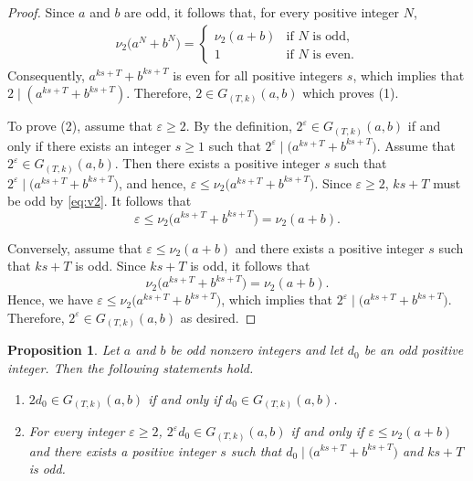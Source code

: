 \documentclass[pdflatex,sn-mathphys-num]{sn-jnl}%
\theoremstyle{thmstyleone}%
\newtheorem{proposition}[theorem]{Proposition}%
\theoremstyle{thmstyletwo}%
\theoremstyle{thmstylethree}%
\begin{document}
\begin{proof}   Since $a$ and $b$ are odd, it follows that, for every positive integer $N$,
\begin{align} \label{eq:v2}
\nu_2\bigl(a^{N}+b^{N}\bigr)=
\begin{cases}
\nu_2(a+b) & \text{if } N \text{ is odd},\\[1mm]
1 & \text{if } N \text{ is even}.
\end{cases}
\end{align}
Consequently, $a^{ks+T}+b^{ks+T}$ is  even for all positive integers $s$, which implies that 
$
2\mid (a^{ks+T}+b^{ks+T})$.   Therefore, 
$
2\in G_{(T,k)}(a,b)$ which proves (1).




 


To prove (2), assume that $\varepsilon\ge 2$. By the definition,
$
2^\varepsilon\in G_{(T,k)}(a,b)
$
if and only if there exists an integer $s\ge 1$ such that
$
2^\varepsilon\mid \bigl(a^{ks+T}+b^{ks+T}\bigr)$. Assume that
$
2^\varepsilon\in G_{(T,k)}(a,b)$. Then there exists a positive  integer $s$ such that $
2^\varepsilon\mid \bigl(a^{ks+T}+b^{ks+T}\bigr)$,
and hence,
$
\varepsilon\le \nu_2\bigl(a^{ks+T}+b^{ks+T}\bigr)$.
Since $\varepsilon\ge 2$,   $ks+T$ must be odd by \eqref{eq:v2}. It follows that
\[
\varepsilon\le  \nu_2\bigl(a^{ks+T}+b^{ks+T}\bigr)=\nu_2(a+b).\]

Conversely, assume that  $\varepsilon\le \nu_2(a+b)$ and there exists a positive integer $s$ such that
$
ks+T$  is odd.
Since $ks+T$ is odd,  it follows that 
\[
\nu_2\bigl(a^{ks+T}+b^{ks+T}\bigr)=\nu_2(a+b).
\]
Hence,  we have 
$
\varepsilon\le \nu_2\bigl(a^{ks+T}+b^{ks+T}\bigr)$,
which implies that 
$
2^\varepsilon\mid \bigl(a^{ks+T}+b^{ks+T}\bigr)$.
Therefore, $
2^\varepsilon\in G_{(T,k)}(a,b)$ as desired.
\end{proof}

\begin{proposition}\label{prop:even-case}
Let $a$ and $b$ be odd nonzero integers and let $d_0$ be an odd positive integer. Then the following statements hold.
\begin{enumerate}[$(1)$]
\item
$
2d_0\in G_{(T,k)}(a,b)$ 
if and only if
$
d_0\in G_{(T,k)}(a,b)$.


\item For every integer $\varepsilon\ge 2$,
$
2^\varepsilon d_0\in G_{(T,k)}(a,b)$
if and only if  $\varepsilon\le \nu_2(a+b)$  and there exists a positive  integer $s$ such that
$
d_0\mid \bigl(a^{ks+T}+b^{ks+T}\bigr)$ and $
ks+T$  is odd.
\end{enumerate}
\end{proposition}
\end{document}
